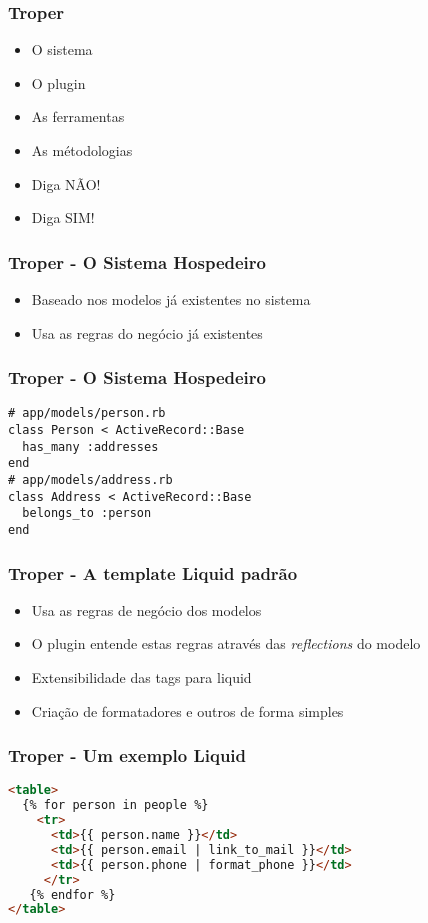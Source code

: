 \documentclass{beamer}
\begin{document}
 
\begin{frame} 
\frametitle{Troper} 
\begin{itemize} 
\item O sistema
\item O plugin
\item As ferramentas 
\item As métodologias
\item Diga NÃO!
\item Diga SIM!
\end{itemize} 
\end{frame} 

\begin{frame} 
\frametitle{Troper - O Sistema Hospedeiro} 
\begin{itemize} 
  \item Baseado nos modelos já existentes no sistema
  \item Usa as regras do negócio já existentes
\end{itemize} 
\end{frame} 

\begin{frame}[fragile]
\frametitle{Troper - O Sistema Hospedeiro} 
\begin{lstlisting}[caption=Modelo ActiveRecord]
# app/models/person.rb
class Person < ActiveRecord::Base
  has_many :addresses
end
# app/models/address.rb
class Address < ActiveRecord::Base
  belongs_to :person 
end
\end{lstlisting}
\end{frame}

\begin{frame} 
\frametitle{Troper - A template Liquid padrão } 
\begin{itemize} 
  \item Usa as regras de negócio dos modelos
  \item O plugin entende estas regras através das \textit{reflections} do modelo
  \item Extensibilidade das tags para liquid
  \item Criação de formatadores e outros de forma simples 
\end{itemize} 
\end{frame} 

\begin{frame}[fragile]
\frametitle{Troper - Um exemplo Liquid} 
\begin{lstlisting}[language=html, caption=Template do Liquid]
<table>
  {% for person in people %}
    <tr>
      <td>{{ person.name }}</td>
      <td>{{ person.email | link_to_mail }}</td>
      <td>{{ person.phone | format_phone }}</td>
     </tr>
   {% endfor %}      
</table>
\end{lstlisting}
\end{frame}
\end{document}
